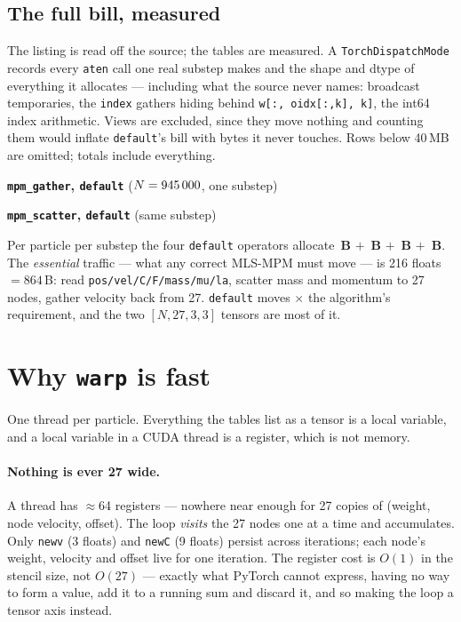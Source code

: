 \documentclass[11pt,a4paper]{article}
\newcommand{\code}[1]{\texttt{\small #1}}
\newcommand{\bd}[1]{\textcolor{bad}{\textbf{#1}}}
\begin{document}
\subsection{The full bill, measured}

The listing is read off the source; the tables are measured. A \code{TorchDispatchMode} records every
\code{aten} call one real substep makes and the shape and dtype of everything it allocates ---
including what the source never names: broadcast temporaries, the \code{index} gathers hiding behind
\code{w[:, oidx[:,k], k]}, the int64 index arithmetic. Views are excluded, since they move nothing
and counting them would inflate \code{default}'s bill with bytes it never touches. Rows below 40\,MB
are omitted; totals include everything.

\begin{center}
\footnotesize
\textbf{\code{mpm\_gather}, \code{default}} \quad ($N=945\,000$, one substep)\\[2pt]
\tblGatherDefault
\end{center}

\begin{center}
\footnotesize
\textbf{\code{mpm\_scatter}, \code{default}} \quad (same substep)\\[2pt]
\tblScatterDefault
\end{center}

\noindent
Per particle per substep the four \code{default} operators allocate \bd{\bpstrain\,B} $+$
\bd{\bpscatter\,B} $+$ \bd{\bpgridupdate\,B} $+$ \bd{\bpgather\,B}. The \emph{essential} traffic ---
what any correct MLS-MPM must move --- is 216 floats $=864$\,B: read
\code{pos/vel/C/F/mass/mu/la}, scatter mass and momentum to 27 nodes, gather velocity back from 27.
\code{default} moves \bd{\ampltotal$\times$} the algorithm's requirement, and the two
$[N,27,3,3]$ tensors are most of it.

\section{Why \code{warp} is fast}

One thread per particle. Everything the tables list as a tensor is a local variable, and a local
variable in a CUDA thread is a register, which is not memory.

\paragraph{Nothing is ever 27 wide.} A thread has $\approx$64 registers --- nowhere near enough for
27 copies of (weight, node velocity, offset). The loop \emph{visits} the 27 nodes one at a time and
accumulates. Only \code{newv} (3 floats) and \code{newC} (9 floats) persist across iterations; each
node's weight, velocity and offset live for one iteration. The register cost is $O(1)$ in the stencil
size, not $O(27)$ --- exactly what PyTorch cannot express, having no way to form a value, add it to a
running sum and discard it, and so making the loop a tensor axis instead.
\end{document}
